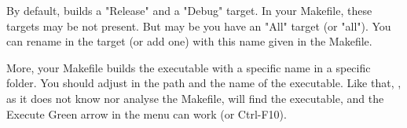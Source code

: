 By default, \codeblocks builds a "Release" and a "Debug" target. In your Makefile, these targets may be not present. But may be you have an "All" target (or "all"). You can rename in \codeblocks the target (or add one) with this name given in the Makefile. 

More, your Makefile builds the executable with a specific name in a specific folder. You should adjust in \codeblocks the path and the name of the executable. Like that, \codeblocks, as it does not know nor analyse the Makefile, will find the executable, and the Execute Green arrow in the menu can work (or Ctrl-F10).

